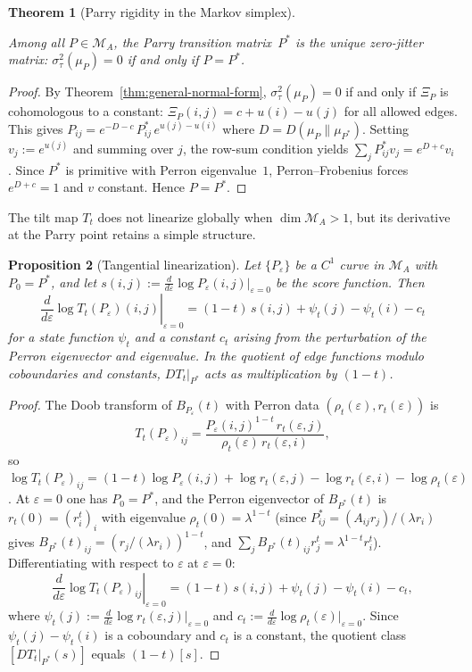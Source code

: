 \documentclass[pdflatex,sn-basic,Numbered]{sn-jnl}
\theoremstyle{thmstyleone}
\newtheorem{theorem}{Theorem}[section]
\newtheorem{proposition}[theorem]{Proposition}
\theoremstyle{thmstyletwo}
\theoremstyle{thmstylethree}
\newcommand{\leanverified}[1]{}
\begin{document}
\begin{theorem}[Parry rigidity in the Markov simplex]\label{thm:general-rigidity}
\leanverified{paper_zero_jitter_general_rigidity}
Among all $P\in\mathcal{M}_A$, the Parry transition matrix~$P^*$ is the unique zero-jitter matrix: $\sigma_\tau^2(\mu_P)=0$ if and only if $P=P^*$.
\end{theorem}

\begin{proof}
By Theorem~\ref{thm:general-normal-form}, $\sigma_\tau^2(\mu_P)=0$ if and only if $\Xi_P$ is cohomologous to a constant: $\Xi_P(i,j)=c+u(i)-u(j)$ for all allowed edges. This gives $P_{ij}=e^{-D-c}\,P^*_{ij}\,e^{u(j)-u(i)}$ where $D=D(\mu_P\|\mu_{P^*})$. Setting $v_j:=e^{u(j)}$ and summing over $j$, the row-sum condition yields $\sum_jP^*_{ij}v_j=e^{D+c}v_i$. Since $P^*$ is primitive with Perron eigenvalue~$1$, Perron--Frobenius forces $e^{D+c}=1$ and $v$ constant. Hence $P=P^*$.
\end{proof}

The tilt map $T_t$ does not linearize globally when $\dim\mathcal{M}_A>1$, but its derivative at the Parry point retains a simple structure.

\begin{proposition}[Tangential linearization]\label{prop:tangential}
Let $\{P_\varepsilon\}$ be a $C^1$ curve in $\mathcal{M}_A$ with $P_0=P^*$, and let $s(i,j):=\frac{d}{d\varepsilon}\log P_\varepsilon(i,j)|_{\varepsilon=0}$ be the score function. Then
\[
\left.\frac{d}{d\varepsilon}\log T_t(P_\varepsilon)(i,j)\right|_{\varepsilon=0}=(1-t)\,s(i,j)+\psi_t(j)-\psi_t(i)-c_t
\]
for a state function $\psi_t$ and a constant $c_t$ arising from the perturbation of the Perron eigenvector and eigenvalue. In the quotient of edge functions modulo coboundaries and constants, $DT_t|_{P^*}$ acts as multiplication by $(1-t)$.
\end{proposition}

\begin{proof}
The Doob transform of $B_{P_\varepsilon}(t)$ with Perron data $(\rho_t(\varepsilon),r_t(\varepsilon))$ is
\[
T_t(P_\varepsilon)_{ij}=\frac{P_\varepsilon(i,j)^{1-t}\,r_t(\varepsilon,j)}{\rho_t(\varepsilon)\,r_t(\varepsilon,i)},
\]
so $\log T_t(P_\varepsilon)_{ij}=(1-t)\log P_\varepsilon(i,j)+\log r_t(\varepsilon,j)-\log r_t(\varepsilon,i)-\log\rho_t(\varepsilon)$.
At $\varepsilon=0$ one has $P_0=P^*$, and the Perron eigenvector of $B_{P^*}(t)$ is $r_t(0)=(r_i^t)_i$ with eigenvalue $\rho_t(0)=\lambda^{1-t}$ (since $P^*_{ij}=(A_{ij}r_j)/(\lambda r_i)$ gives $B_{P^*}(t)_{ij}=(r_j/(\lambda r_i))^{1-t}$, and $\sum_jB_{P^*}(t)_{ij}r_j^t=\lambda^{1-t}r_i^t$). Differentiating with respect to $\varepsilon$ at $\varepsilon=0$:
\[
\left.\frac{d}{d\varepsilon}\log T_t(P_\varepsilon)_{ij}\right|_{\varepsilon=0}
=
(1-t)\,s(i,j)+\psi_t(j)-\psi_t(i)-c_t,
\]
where $\psi_t(j):=\frac{d}{d\varepsilon}\log r_t(\varepsilon,j)|_{\varepsilon=0}$ and $c_t:=\frac{d}{d\varepsilon}\log\rho_t(\varepsilon)|_{\varepsilon=0}$. Since $\psi_t(j)-\psi_t(i)$ is a coboundary and $c_t$ is a constant, the quotient class $[DT_t|_{P^*}(s)]$ equals $(1-t)[s]$.
\end{proof}
\end{document}
